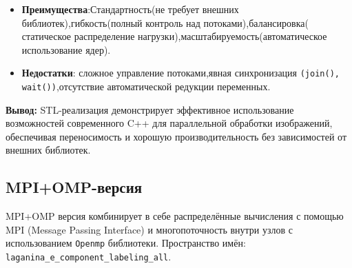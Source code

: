 \documentclass[12pt]{extarticle}
\begin{document}
\begin{itemize}
      управление потоками.
     \begin{lstlisting}[caption={Динамическое управление потоками},label={all}]
     int num_threads = std::min(ppc::util::GetPPCNumThreads(),
                         static_cast<int>(std::thread::hardware_concurrency()));
     \end{lstlisting}
      разделение данных.
      \begin{lstlisting}[caption={Статическое разделение данных},label={all}]
      const int chunk_size = (size + num_threads - 1) / num_threads;
      \end{lstlisting}
       задачи.
      \begin{lstlisting}[caption={Асинхронные задачи},label={all}]
      auto future = std::async(std::launch::async, [&] { /* задача */ });
      \end{lstlisting}
    \item \textbf{Преимущества}:Стандартность(не требует внешних библиотек),гибкость(полный контроль над потоками),балансировка( статическое распределение нагрузки),масштабируемость(автоматическое использование ядер).
    \item \textbf{Недостатки}: сложное управление потоками,явная синхронизация \texttt{(join(), wait())},отсутствие автоматической редукции переменных.
\end{itemize}

\textbf{Вывод:} STL-реализация демонстрирует эффективное использование возможностей современного C++ для параллельной обработки изображений, обеспечивая переносимость и хорошую производительность без зависимостей от внешних библиотек.

\subsection{MPI+OMP-версия}

\hspace*{1.25cm}MPI+OMP версия комбинирует в себе распределённые вычисления с помощью MPI (Message Passing Interface) и многопоточность внутри узлов с использованием \texttt{Openmp} библиотеки. Пространство имён: \texttt{laganina\_e\_component\_labeling\_all}. \\[-0.1cm]
\end{document}
